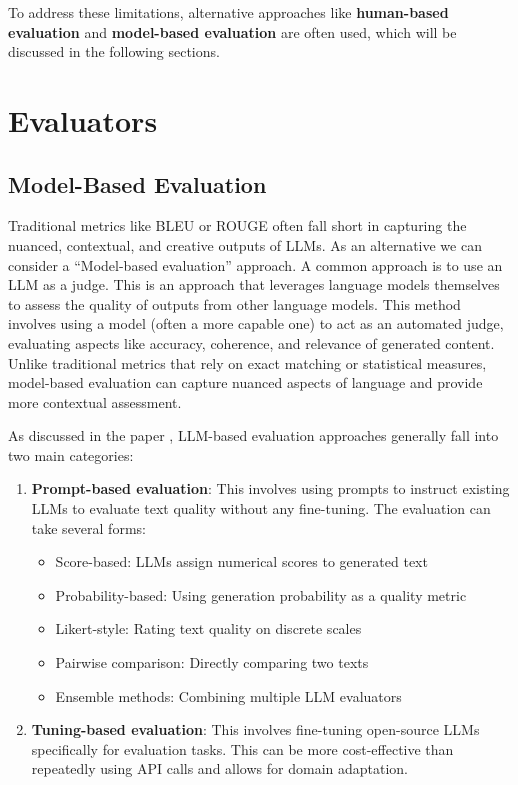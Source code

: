 To address these limitations, alternative approaches like \textbf{human-based evaluation} and \textbf{model-based evaluation} are often used, which will be discussed in the following sections.
\section{Evaluators}

\subsection{Model-Based Evaluation}
\label{sec:model-based-eval}
Traditional metrics like BLEU or ROUGE often fall short in capturing the nuanced, contextual, and creative outputs of LLMs. As an alternative we can consider a ``Model-based evaluation'' approach. A common approach is to use an LLM as a judge. This is an approach that leverages language models themselves to assess the quality of outputs from other language models. This method involves using a model (often a more capable one) to act as an automated judge, evaluating aspects like accuracy, coherence, and relevance of generated content. Unlike traditional metrics that rely on exact matching or statistical measures, model-based evaluation can capture nuanced aspects of language and provide more contextual assessment.

As discussed in the paper , LLM-based evaluation approaches generally fall into two main categories:

\begin{enumerate}
    \item \textbf{Prompt-based evaluation}: This involves using prompts to instruct existing LLMs to evaluate text quality without any fine-tuning. The evaluation can take several forms:
    \begin{itemize}
        \item Score-based: LLMs assign numerical scores to generated text
        \item Probability-based: Using generation probability as a quality metric
        \item Likert-style: Rating text quality on discrete scales
        \item Pairwise comparison: Directly comparing two texts
        \item Ensemble methods: Combining multiple LLM evaluators
    \end{itemize}
    \item \textbf{Tuning-based evaluation}: This involves fine-tuning open-source LLMs specifically for evaluation tasks. This can be more cost-effective than repeatedly using API calls and allows for domain adaptation.
\end{enumerate}

